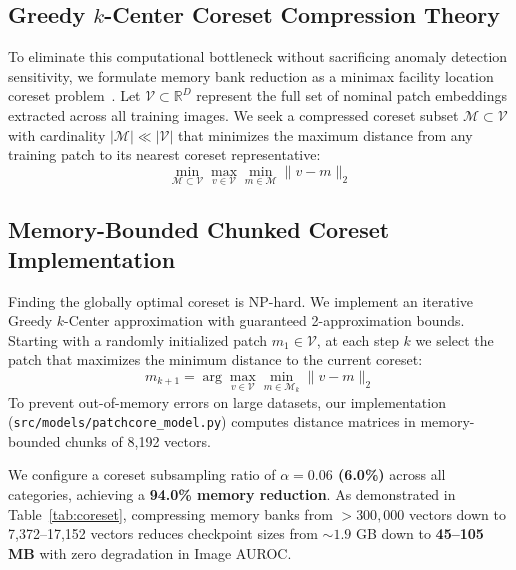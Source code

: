 \documentclass[journal,twocolumn]{IEEEtran}
\begin{document}
\subsection{Greedy $k$-Center Coreset Compression Theory}
To eliminate this computational bottleneck without sacrificing anomaly detection sensitivity, we formulate memory bank reduction as a minimax facility location coreset problem~\cite{sener2018active}. Let $\mathcal{V} \subset \mathbb{R}^D$ represent the full set of nominal patch embeddings extracted across all training images. We seek a compressed coreset subset $\mathcal{M} \subset \mathcal{V}$ with cardinality $|\mathcal{M}| \ll |\mathcal{V}|$ that minimizes the maximum distance from any training patch to its nearest coreset representative:
\begin{equation}
\min_{\mathcal{M} \subset \mathcal{V}} \max_{v \in \mathcal{V}} \min_{m \in \mathcal{M}} \|v - m\|_2
\end{equation}

\subsection{Memory-Bounded Chunked Coreset Implementation}
Finding the globally optimal coreset is NP-hard. We implement an iterative Greedy $k$-Center approximation with guaranteed 2-approximation bounds. Starting with a randomly initialized patch $m_1 \in \mathcal{V}$, at each step $k$ we select the patch that maximizes the minimum distance to the current coreset:
\begin{equation}
m_{k+1} = \arg\max_{v \in \mathcal{V}} \min_{m \in \mathcal{M}_k} \|v - m\|_2
\end{equation}
To prevent out-of-memory errors on large datasets, our implementation (\texttt{src/models/patchcore\_model.py}) computes distance matrices in memory-bounded chunks of 8,192 vectors.

We configure a coreset subsampling ratio of \textbf{$\alpha = 0.06$ (6.0\%)} across all categories, achieving a \textbf{94.0\% memory reduction}. As demonstrated in Table~\ref{tab:coreset}, compressing memory banks from $>300,000$ vectors down to 7,372--17,152 vectors reduces checkpoint sizes from $\sim 1.9$ GB down to \textbf{45--105 MB} with zero degradation in Image AUROC.
\end{document}
